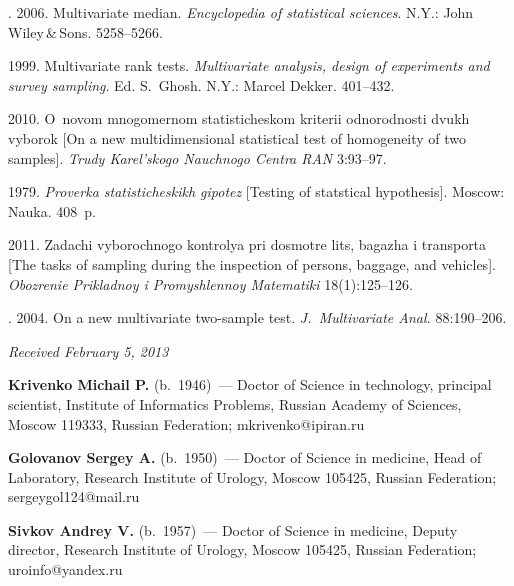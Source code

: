 \begin{multicols}{2}
{{\begin{thebibliography}{99}
. 2006. Multivariate median. \textit{Encyclopedia of 
statistical sciences}. 
N.Y.: John Wiley\,\&\,Sons. 5258--5266.

\vspace*{5pt}

 1999. Multivariate rank tests. \textit{Multivariate analysis, design of experiments and 
survey sampling}. Ed. S.~Ghosh. N.Y.: Marcel Dekker. 401--432.

\vspace*{5pt}
 2010. O~novom mnogomernom statisticheskom 
kriterii odnorodnosti dvukh vyborok [On a new multidimensional statistical test of homogeneity of
two samples]. 
\textit{Trudy Karel'skogo Nauchnogo Centra RAN} 3:93--97.

\vspace*{5pt}
 1979. \textit{Proverka statisticheskikh gipotez}
[Testing of statstical hypothesis]. Moscow: Nauka.   408~p.

\vspace*{5pt}
 2011. Zadachi vyborochnogo kon\-t\-ro\-lya pri dosmotre lits, bagazha i 
transporta [The tasks of sampling during the inspection of
persons, baggage, and vehicles]. 
\textit{Obozrenie Prikladnoy i Promyshlennoy Matematiki} 18(1):125--126.

\vspace*{5pt}


 
. 2004. On a new multivariate two-sample test. \textit{J.~Multivariate 
Anal.} 88:190--206.
\end{thebibliography}
} }

\end{multicols}

\hfill{\small\textit{Received February 5, 2013}}

\Contr

\noindent
\textbf{Krivenko Michail P.} (b.\ 1946)~--- 
Doctor of Science in technology, principal scientist, Institute of Informatics 
Problems, Russian Academy of Sciences, Moscow 119333, Russian Federation;  mkrivenko@ipiran.ru

\vspace*{3pt}


\noindent\textbf{Golovanov Sergey  A.} (b.\ 1950)~--- Doctor of Science in medicine, Head of 
Laboratory, Research Institute of Urology, Moscow 105425, Russian Federation;
sergeygol124@mail.ru

\vspace*{3pt}

\noindent
\textbf{Sivkov Andrey V.} (b.\ 1957)~--- Doctor of Science in medicine, Deputy director, 
Research Institute of Urology, Moscow 105425, Russian Federation;  uroinfo@yandex.ru



 \label{end\stat}
\renewcommand{\bibname}{\protect\rm Литература}